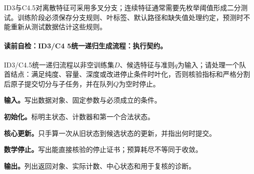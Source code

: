 ID3与C4.5对离散特征可采用多叉分支；连续特征通常需要先枚举阈值形成二分测试。训练阶段必须保存分支规则、叶标签、默认路径和缺失值处理约定，预测时不能重新从测试数据估计这些规则。

\label{struct:V2-C04-CH19}
\label{struct:V2-C04-CH20}
\paragraph{读前自检：ID3/C4 5统一递归生成流程：执行契约。}ID3/C4.5统一递归流程以非空训练集$D$、候选特征与准则$q$为输入；请处理一个队首结点：满足纯度、容量、深度或改进停止条件时叶化，否则核验指标和严格分割后原子提交切分与子任务，并在队列$Q$为空时停止。\par
\begin{keypointbox}[title={ID3/C4.5统一递归生成流程：五步阅读}]
\textbf{输入。}写出数据对象、固定参数与必须成立的条件。\par
\textbf{初始化。}标明主状态、计数器和第一个合法状态。\par
\textbf{核心更新。}只手算一次从旧状态到候选状态的更新，并指出何时提交。\par
\textbf{数学停止。}写出能直接核验的停止证书；预算耗尽不等同于收敛。\par
\textbf{输出。}列出返回对象、实际计数、中心状态和用于复核的诊断。
\end{keypointbox}

